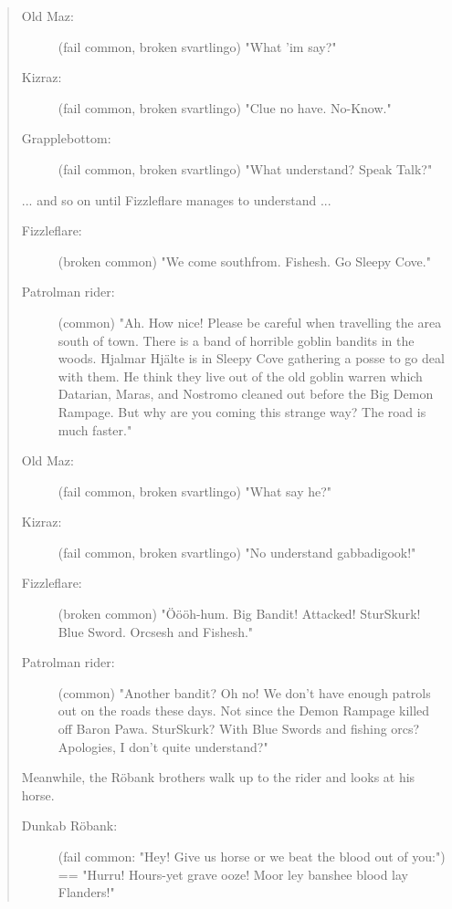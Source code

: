 \begin{quote}
\begin{small}
\begin{description}
\item[Old Maz:] \vvsmall (fail common, broken svartlingo) \small
"What 'im say?"

\item[Kizraz:] \vvsmall (fail common, broken svartlingo) \small
"Clue no have. No-Know."

\item[Grapplebottom:] \vvsmall (fail common, broken svartlingo) \small
"What understand? Speak Talk?"

\end{description}
... and so on until Fizzleflare manages to understand ...
\begin{description}

\item[Fizzleflare:] \vvsmall (broken common) \small
"We come southfrom. Fishesh. Go Sleepy Cove."

\item[Patrolman rider:] \vvsmall (common) \small
"Ah. How nice! Please be careful when travelling the area south of town. There is a band of horrible goblin bandits in the woods. Hjalmar Hjälte is in Sleepy Cove gathering a posse to go deal with them. He think they live out of the old goblin warren which Datarian, Maras, and Nostromo cleaned out before the Big Demon Rampage. But why are you coming this strange way? The road is much faster."

\item[Old Maz:] \vvsmall (fail common, broken svartlingo) \small
"What say he?"

\item[Kizraz:] \vvsmall (fail common, broken svartlingo) \small
"No understand gabbadigook!"

\item[Fizzleflare:] \vvsmall (broken common) \small
"Öööh-hum. Big Bandit! Attacked! SturSkurk! Blue Sword. Orcsesh and Fishesh."

\item[Patrolman rider:] \vvsmall (common) \small
"Another bandit? Oh no! We don't have enough patrols out on the roads these days. Not since the Demon Rampage killed off Baron Pawa. SturSkurk? With Blue Swords and fishing orcs? Apologies, I don't quite understand?"

\end{description}
Meanwhile, the Röbank brothers walk up to the rider and looks at his horse.
\begin{description}

\item[Dunkab Röbank:] \vvsmall (fail common: "Hey! Give us horse or we beat the blood out of you:") \small
== "Hurru! Hours-yet grave ooze! Moor ley banshee blood lay Flanders!"


\end{description}
\end{small}
\end{quote}

